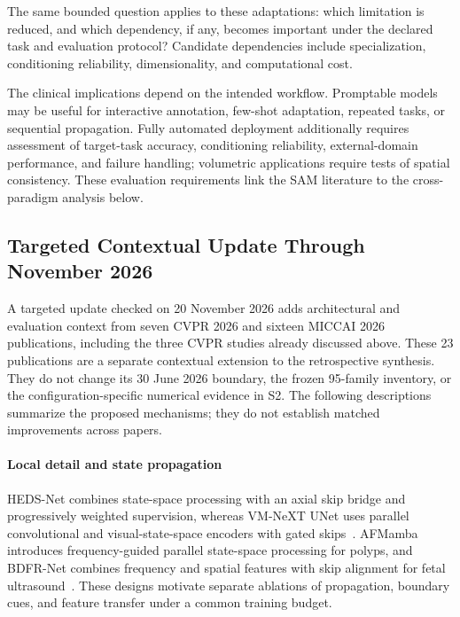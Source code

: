 \documentclass[5p,times,authoryear]{elsarticle}
\begin{document}
The same bounded question applies to these adaptations: which limitation is reduced, and which dependency, if any, becomes important under the declared task and evaluation protocol? Candidate dependencies include specialization, conditioning reliability, dimensionality, and computational cost.

The clinical implications depend on the intended workflow. Promptable models may be useful for interactive annotation, few-shot adaptation, repeated tasks, or sequential propagation. Fully automated deployment additionally requires assessment of target-task accuracy, conditioning reliability, external-domain performance, and failure handling; volumetric applications require tests of spatial consistency. These evaluation requirements link the SAM literature to the cross-paradigm analysis below.



\subsection{Targeted Contextual Update Through November 2026}
\label{subsec:context_update_2026}

A targeted update checked on 20 November 2026 adds architectural and evaluation context from seven CVPR 2026 and sixteen MICCAI 2026 publications, including the three CVPR studies already discussed above. These 23 publications are a separate contextual extension to the retrospective synthesis. They do not change its 30 June 2026 boundary, the frozen 95-family inventory, or the configuration-specific numerical evidence in S2. The following descriptions summarize the proposed mechanisms; they do not establish matched improvements across papers.

\paragraph{Local detail and state propagation}
HEDS-Net combines state-space processing with an axial skip bridge and progressively weighted supervision, whereas VM-NeXT UNet uses parallel convolutional and visual-state-space encoders with gated skips~\citep{fan2026hedsnet_context,cao2026vmnext_context}. AFMamba introduces frequency-guided parallel state-space processing for polyps, and BDFR-Net combines frequency and spatial features with skip alignment for fetal ultrasound~\citep{jiang2026afmamba_context,zhang2026bdfrnet_context}. These designs motivate separate ablations of propagation, boundary cues, and feature transfer under a common training budget.
\end{document}
